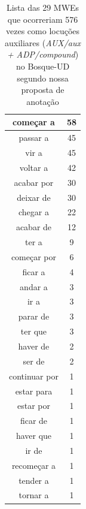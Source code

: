 \documentclass[output=paper,colorlinks,citecolor=brown]{langscibook}
\begin{document}
\begin{table}[]
{\begin{tabular}{|c|c|}
				começar a & 58\\\hline
				passar a & 45\\\hline
				vir a & 45\\\hline
				voltar a & 42\\\hline
				acabar por & 30\\\hline
				deixar de & 30\\\hline
				chegar a & 22\\\hline
				acabar de & 12\\\hline
				ter a & 9\\\hline
				começar por & 6\\\hline
				ficar a & 4\\\hline
				andar a & 3\\\hline
				ir a & 3\\\hline
				parar de & 3\\\hline
				ter que & 3\\\hline
				haver de & 2\\\hline
				ser de & 2\\\hline
				continuar por & 1\\\hline
				estar para & 1\\\hline
				estar por & 1\\\hline
				ficar de & 1\\\hline
				haver que & 1\\\hline
				ir de & 1\\\hline
				recomeçar a & 1\\\hline
				tender a & 1\\\hline
				tornar a & 1\\\hline
			\end{tabular}
		}
		\caption{Lista das 29 MWEs que ocorreriam 576 vezes como locuções auxiliares (\emph{AUX/aux + ADP/compound}) no Bosque-UD segundo nossa proposta de anotação}
		\label{tab:auxphrasalverb}
	\end{table}
\end{document}
